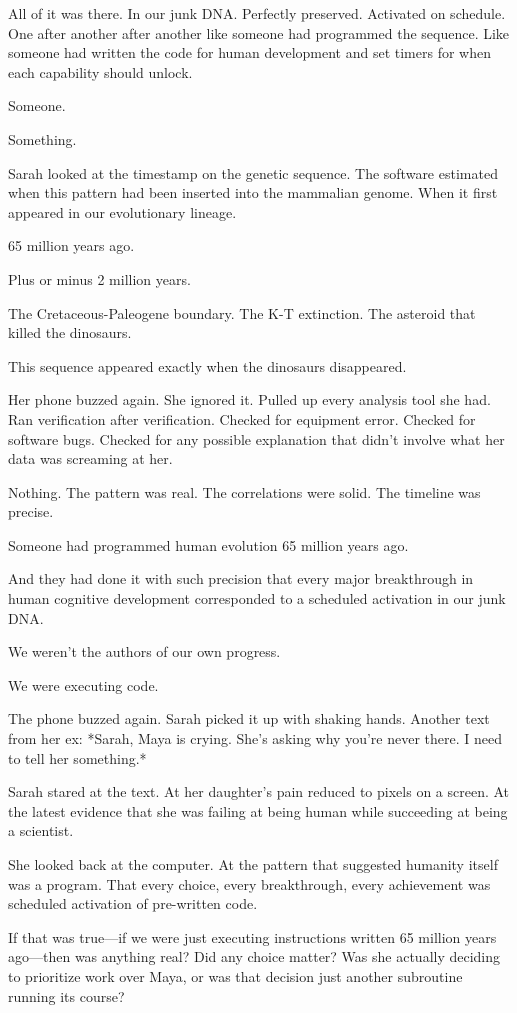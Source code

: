 All of it was there. In our junk DNA. Perfectly preserved. Activated on schedule. One after another after another like someone had programmed the sequence. Like someone had written the code for human development and set timers for when each capability should unlock.

Someone.

Something.

Sarah looked at the timestamp on the genetic sequence. The software estimated when this pattern had been inserted into the mammalian genome. When it first appeared in our evolutionary lineage.

65 million years ago.

Plus or minus 2 million years.

The Cretaceous-Paleogene boundary. The K-T extinction. The asteroid that killed the dinosaurs.

This sequence appeared exactly when the dinosaurs disappeared.

Her phone buzzed again. She ignored it. Pulled up every analysis tool she had. Ran verification after verification. Checked for equipment error. Checked for software bugs. Checked for any possible explanation that didn't involve what her data was screaming at her.

Nothing. The pattern was real. The correlations were solid. The timeline was precise.

Someone had programmed human evolution 65 million years ago.

And they had done it with such precision that every major breakthrough in human cognitive development corresponded to a scheduled activation in our junk DNA.

We weren't the authors of our own progress.

We were executing code.

The phone buzzed again. Sarah picked it up with shaking hands. Another text from her ex: *Sarah, Maya is crying. She's asking why you're never there. I need to tell her something.*

Sarah stared at the text. At her daughter's pain reduced to pixels on a screen. At the latest evidence that she was failing at being human while succeeding at being a scientist.

She looked back at the computer. At the pattern that suggested humanity itself was a program. That every choice, every breakthrough, every achievement was scheduled activation of pre-written code.

If that was true—if we were just executing instructions written 65 million years ago—then was anything real? Did any choice matter? Was she actually deciding to prioritize work over Maya, or was that decision just another subroutine running its course?

